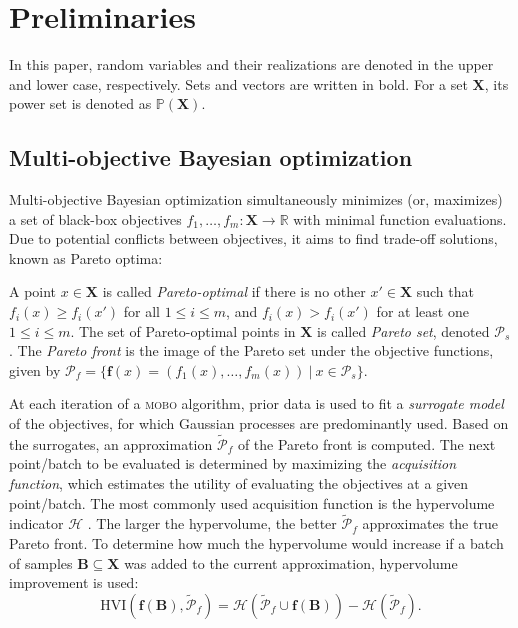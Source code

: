 \section{Preliminaries}

In this paper, random variables and their realizations are denoted in the upper and lower case, respectively. Sets and vectors are written in bold. For a set $\mathbf{X}$, its power set is denoted as $\mathbb{P}(\mathbf{X})$.

\subsection{Multi-objective Bayesian optimization}\label{subsec:prelim_mobo}
Multi-objective Bayesian optimization simultaneously minimizes (or, maximizes) a set of black-box objectives $f_1, \dots, f_m: \mathbf{X} \rightarrow \mathbb{R}$ with minimal function evaluations. Due to potential conflicts between objectives, it aims to find trade-off solutions, known as Pareto optima:

\begin{definition}
    A point $x \in \mathbf{X}$ is called \textit{Pareto-optimal} if there is no other $x' \in \mathbf{X}$ such that $f_i(x) \geq f_i(x')$ for all $1\leq i \leq m$, and $f_i(x) > f_i(x')$ for at least one $1\leq i \leq m$. The set of Pareto-optimal points in $\mathbf{X}$ is called \textit{Pareto set}, denoted $\mathcal{P}_s$. The \textit{Pareto front} is the image of the Pareto set under the objective functions, given by $\mathcal{P}_f = \{ \mathbf{f}(x) = (f_1(x),\dots,f_m(x)) \ | \ x \in \mathcal{P}_s \}$.
\end{definition}

At each iteration of a \textsc{mobo} algorithm, prior data is used to fit a \textit{surrogate model} of the objectives, for which Gaussian processes \cite{gps} are predominantly used. Based on the surrogates, an approximation $\tilde{\mathcal{P}}_f$ of the Pareto front is computed. The next point/batch to be evaluated is determined by maximizing the \textit{acquisition function}, which estimates the utility of evaluating the objectives at a given point/batch. The most commonly used acquisition function is the hypervolume indicator $\mathcal{H}$ \citep{dgemo_hypervolume}. The larger the hypervolume, the better $\tilde{\mathcal{P}}_f$  approximates the true Pareto front. To determine how much the hypervolume would increase if a batch of samples $\mathbf{B} \subseteq \mathbf{X}$ was added to the current approximation, hypervolume improvement is used:
\begin{equation}
    \text{HVI}(\mathbf{f}(\mathbf{B}), \tilde{\mathcal{P}}_f)= \mathcal{H} (\tilde{\mathcal{P}}_f \cup \mathbf{f}(\mathbf{B})) - \mathcal{H}(\tilde{\mathcal{P}}_f).
\end{equation}

